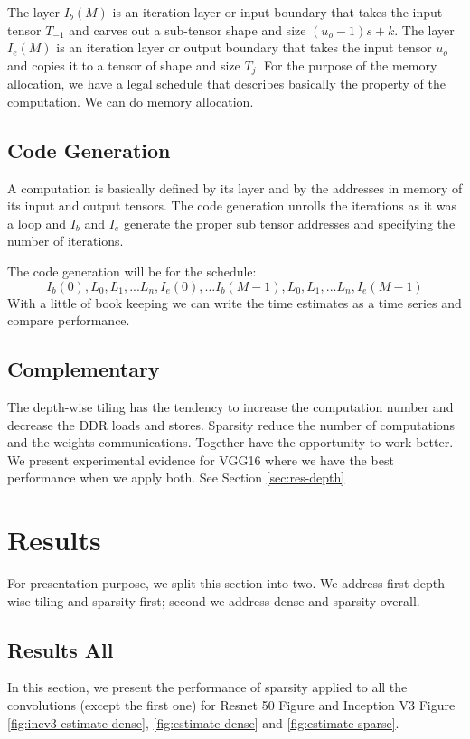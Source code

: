 \documentclass[conference]{IEEEtran}
\begin{document}
The layer $I_b(M)$ is an iteration layer or input boundary that takes
the input tensor $T_{-1}$ and carves out a sub-tensor shape and size
$(u_o-1)s+k$. The layer $I_e(M)$ is an iteration layer or output
boundary that takes the input tensor $u_o$ and copies it to a tensor
of shape and size $T_j$. For the purpose of the memory allocation, we
have a legal schedule that describes basically the property of the
computation.  We can do memory allocation.

\subsection{Code Generation}
A computation is basically defined by its layer and by the addresses
in memory of its input and output tensors. The code generation unrolls
the iterations as it was a loop and $I_b$ and $I_e$ generate the
proper sub tensor addresses and specifying the number of iterations.

The code generation will be for the schedule:
\[ I_b(0), L_0, L_1, ... L_n, I_e(0), \dots I_b(M-1), L_0, L_1, ... L_n, I_e(M-1) \]
With a little of book keeping we can write the time estimates as a
time series and compare performance.

\subsection{Complementary}
The depth-wise tiling has the tendency to increase the computation
number and decrease the DDR loads and stores. Sparsity reduce the
number of computations and the weights communications. Together have
the opportunity to work better. We present experimental evidence for
VGG16 where we have the best performance when we apply both. See
Section \ref{sec:res-depth}

\section{Results}
For presentation purpose, we split this section into two. We address
first depth-wise tiling and sparsity first; second we address dense
and sparsity overall.
 



\subsection{Results All}
\label{sec:experiments}
In this section, we present the performance of sparsity applied to all
the convolutions (except the first one) for Resnet 50 Figure and
Inception V3 Figure \ref{fig:incv3-estimate-dense},
\ref{fig:estimate-dense} and \ref{fig:estimate-sparse}.
\end{document}
